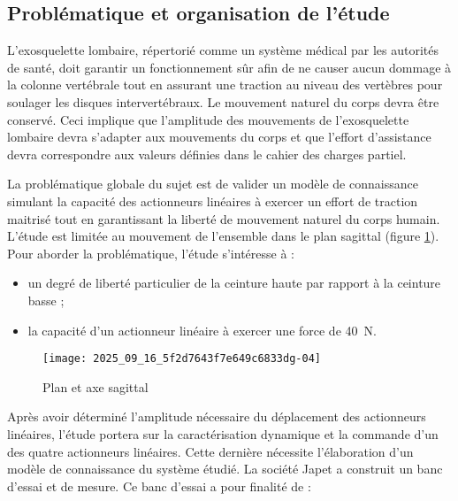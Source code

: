 \subsection{Problématique et organisation de l'étude}

\ifprof
\else

L'exosquelette lombaire, répertorié comme un système médical par les autorités de santé, doit garantir un fonctionnement sûr afin de ne causer aucun dommage à la colonne vertébrale tout en assurant une traction au niveau des vertèbres pour soulager les disques intervertébraux. Le mouvement naturel du corps devra être conservé. Ceci implique que l'amplitude des mouvements de l'exosquelette lombaire devra s'adapter aux mouvements du corps et que l'effort d'assistance devra correspondre aux valeurs définies dans le cahier des charges partiel.

La problématique globale du sujet est de valider un modèle de connaissance simulant la capacité des actionneurs linéaires à exercer un effort de traction maitrisé tout en garantissant la liberté de mouvement naturel du corps humain.\\
L'étude est limitée au mouvement de l'ensemble dans le plan sagittal (figure \ref{ccs_mp_2023_fig_05}). Pour aborder la problématique, l'étude s'intéresse à :

\begin{itemize}
  \item un degré de liberté particulier de la ceinture haute par rapport à la ceinture basse ;
  \item la capacité d'un actionneur linéaire à exercer une force de \SI{40}{N}.
\end{itemize}


\begin{figure}[!h]
\centering
\texttt{[image: 2025\_09\_16\_5f2d7643f7e649c6833dg-04]}
\caption{\label{ccs_mp_2023_fig_05}  Plan et axe sagittal}
\end{figure}


Après avoir déterminé l'amplitude nécessaire du déplacement des actionneurs linéaires, l'étude portera sur la caractérisation dynamique et la commande d'un des quatre actionneurs linéaires. Cette dernière nécessite l'élaboration d'un modèle de connaissance du système étudié. La société Japet a construit un banc d'essai et de mesure. Ce banc d'essai a pour finalité de :

